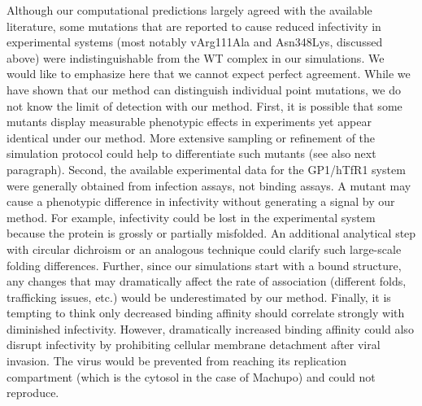 \documentclass[12pt]{article}
\begin{document}
Although our computational predictions largely agreed with the available literature, some mutations that are reported to cause reduced infectivity in experimental systems (most notably vArg111Ala and Asn348Lys, discussed above) were indistinguishable from the WT complex in our simulations. We would like to emphasize here that we cannot expect perfect agreement. While we have shown that our method can distinguish individual point mutations, we do not know the limit of detection with our method. First, it is possible that some mutants display measurable phenotypic effects in experiments yet appear identical under our method. More extensive sampling or refinement of the simulation protocol could help to differentiate such mutants (see also next paragraph). Second, the available experimental data for the GP1/hTfR1 system were generally obtained from infection assays, not binding assays. A mutant may cause a phenotypic difference in infectivity without generating a signal by our method. For example, infectivity could be lost in the experimental system because the protein is grossly or partially misfolded. An additional analytical step with circular dichroism or an analogous technique could clarify such large-scale folding differences. Further, since our simulations start with a bound structure, any changes that may dramatically affect the rate of association (different folds, trafficking issues, etc.) would be underestimated by our method. Finally, it is tempting to think only decreased binding affinity should correlate strongly with diminished infectivity. However, dramatically increased binding affinity could also disrupt infectivity by prohibiting cellular membrane detachment after viral invasion. The virus would be prevented from reaching its replication compartment (which is the cytosol in the case of Machupo) and could not reproduce.
\end{document}
